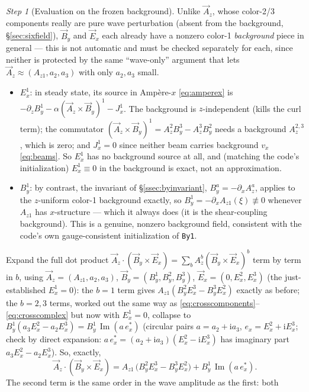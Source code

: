 \documentclass[11pt,a4paper]{article}
\numberwithin{equation}{section}
\theoremstyle{remark}
\newtheorem{step}{Step}[subsection]
\newcommand{\Az}{A_{z1}}
\newcommand{\ii}{\mathrm{i}}
\newcommand{\Imy}{\operatorname{Im}}
\begin{document}
\begin{step}[Evaluation on the frozen background]
Unlike $\vec A_z$, whose color-2/3 components really are pure wave
perturbation (absent from the background, \S\ref{sec:sixfield}), $\vec B_y$
and $\vec E_x$ each already have a nonzero color-1 \emph{background} piece
in general --- this is not automatic and must be checked separately for
each, since neither is protected by the same ``wave-only'' argument that
lets $\vec A_z\approx(\Az,a_2,a_3)$ with only $a_2,a_3$ small.
\begin{itemize}
\item $E_x^1$: in steady state, its source in Amp\`ere-$x$
\eqref{eq:amperex} is $-\partial_zB_y^1-\alpha(\vec A_z\times\vec B_y)^1
-J_x^1$. The background is $z$-independent (kills the curl term); the
commutator $(\vec A_z\times\vec B_y)^1=A_z^2B_y^3-A_z^3B_y^2$ needs a
background $A_z^{2,3}$, which is zero; and $J_x^1=0$ since neither beam
carries background $v_x$ \eqref{eq:beams}. So $E_x^1$ has no background
source at all, and (matching the code's initialization) $E_x^1\equiv0$ in
the background is exact, not an approximation.
\item $B_y^1$: by contrast, the invariant of \S\ref{ssec:byinvariant},
$B_y^a=-\partial_xA_z^a$, applies to the $z$-uniform color-1 background
exactly, so $B_y^1=-\partial_x\Az(\xi)\not\equiv0$ whenever $\Az$ has
$x$-structure --- which it always does (it is the shear-coupling
background). This is a genuine, nonzero background field, consistent
with the code's own gauge-consistent initialization of \texttt{By1}.
\end{itemize}
Expand the full dot product $\vec A_z\cdot(\vec B_y\times\vec E_x)
=\sum_b A_z^b(\vec B_y\times\vec E_x)^b$ term by term in $b$, using
$\vec A_z=(\Az,a_2,a_3)$, $\vec B_y=(B_y^1,B_y^2,B_y^3)$,
$\vec E_x=(0,E_x^2,E_x^3)$ (the just-established $E_x^1=0$):
the $b{=}1$ term gives $\Az(B_y^2E_x^3-B_y^3E_x^2)$ exactly as before; the
$b{=}2,3$ terms, worked out the same way as \eqref{eq:crosscomponents}--%
\eqref{eq:crosscomplex} but now with $E_x^1=0$, collapse to
$B_y^1(a_3E_x^2-a_2E_x^3)=B_y^1\,\Imy(a\,e_x^*)$ (circular pairs
$a=a_2+\ii a_3$, $e_x=E_x^2+\ii E_x^3$; check by direct expansion:
$a\,e_x^*=(a_2+\ii a_3)(E_x^2-\ii E_x^3)$ has imaginary part
$a_3E_x^2-a_2E_x^3$). So, exactly,
\begin{equation}
\vec A_z\cdot(\vec B_y\times\vec E_x)
=\Az\,\bigl(B_y^2E_x^3-B_y^3E_x^2\bigr)+B_y^1\,\Imy(a\,e_x^*).
\label{eq:battery-full}
\end{equation}
The second term is the same order in the wave amplitude as the first: both

\end{step}
\end{document}
